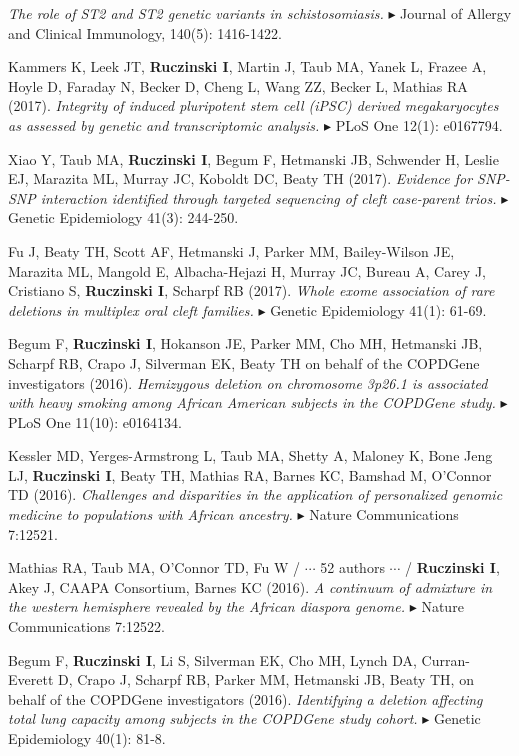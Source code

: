 \documentclass[10pt]{article}
\newcommand{\dg}[1]{{\color{black} $\blacktriangleright$ {#1}}}
\begin{document}
{\it The role of ST2 and ST2 genetic variants in schistosomiasis.}
\dg{Journal of Allergy and Clinical Immunology, 140(5): 1416-1422.}
\item 
Kammers K, Leek JT, {\bf Ruczinski I}, Martin J, Taub MA, Yanek L, Frazee A, Hoyle D, Faraday N, Becker D, Cheng L, Wang ZZ, Becker L, Mathias RA (2017).
{\it Integrity of induced pluripotent stem cell (iPSC) derived megakaryocytes as assessed by genetic and transcriptomic analysis.} 
\dg{PLoS One 12(1): e0167794.}
\item 
Xiao Y, Taub MA, {\bf Ruczinski I}, Begum F, Hetmanski JB, Schwender H, Leslie EJ, Marazita ML, Murray JC, Koboldt DC, Beaty TH (2017).
{\it Evidence for SNP-SNP interaction identified through targeted sequencing of cleft case-parent trios.}
\dg{Genetic Epidemiology 41(3): 244-250.}
\item 
Fu J, Beaty TH, Scott AF, Hetmanski J, Parker MM, Bailey-Wilson JE, Marazita ML, Mangold E, Albacha-Hejazi H, Murray JC, Bureau A, Carey J, Cristiano S, {\bf Ruczinski I}, Scharpf RB (2017).
{\it Whole exome association of rare deletions in multiplex oral cleft families.}
\dg{Genetic Epidemiology 41(1): 61-69.}
\item 
Begum F, {\bf Ruczinski I}, Hokanson JE, Parker MM, Cho MH, Hetmanski JB, Scharpf RB, Crapo J, Silverman EK, Beaty TH on behalf of the COPDGene investigators (2016).
{\it Hemizygous deletion on chromosome 3p26.1 is associated with heavy smoking among African American subjects in the COPDGene study.} 
\dg{PLoS One 11(10): e0164134.}
\item
Kessler MD, Yerges-Armstrong L, Taub MA, Shetty A, Maloney K, Bone Jeng LJ, {\bf Ruczinski I}, Beaty TH, Mathias RA, Barnes KC, Bamshad M, O'Connor TD (2016).
{\it Challenges and disparities in the application of personalized genomic medicine to populations with African ancestry.}
\dg{Nature Communications 7:12521.}
\item 
Mathias RA, Taub MA, O'Connor TD, Fu W / $\cdots$ 52 authors $\cdots$ /
{\bf Ruczinski I}, Akey J, CAAPA Consortium, Barnes KC (2016).
{\it A continuum of admixture in the western hemisphere revealed by the African diaspora genome.}
\dg{Nature Communications 7:12522.}
\item 
Begum F, {\bf Ruczinski I}, Li S, Silverman EK, Cho MH, Lynch DA, Curran-Everett D, Crapo J, Scharpf RB, Parker MM, Hetmanski JB, Beaty TH, on behalf of the COPDGene investigators (2016).
{\it Identifying a deletion affecting total lung capacity among subjects in the COPDGene study cohort.}
\dg{Genetic Epidemiology 40(1): 81-8.}
\end{document}
